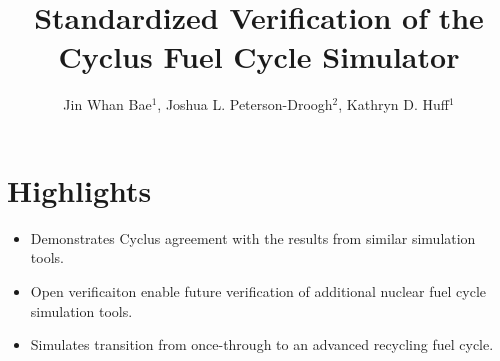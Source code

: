 \documentclass[review]{elsarticle}
\begin{document}
\begin{frontmatter}
\title{Standardized Verification of the Cyclus Fuel Cycle Simulator}
\author{Jin Whan Bae$^{1}$, Joshua L. Peterson-Droogh$^{2}$, Kathryn D. Huff$^{1}$}
\address{$^{1}$Dept. of Nuclear, Plasma, and Radiological Engineering, University of Illinois at Urbana-Champaign, Urbana, IL \\ $^{2}$Oak Ridge National Laboratory, Oak Ridge, TN }

\end{frontmatter}
\section*{Highlights}
\begin{itemize}
       \item Demonstrates Cyclus agreement with the results from similar simulation tools.
       \item Open verificaiton enable future verification of additional nuclear
fuel cycle simulation tools.
       \item Simulates transition from once-through to an advanced recycling fuel cycle. 
\end{itemize}
\end{document}
